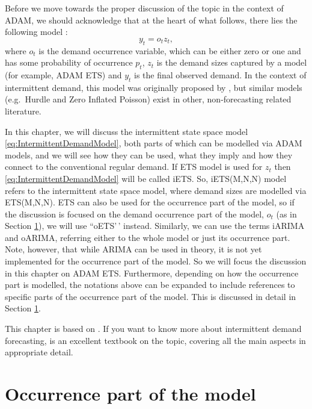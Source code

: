 \documentclass[
]{book}
\theoremstyle{definition}
\theoremstyle{definition}
\theoremstyle{definition}
\theoremstyle{definition}
\theoremstyle{remark}
\begin{document}
Before we move towards the proper discussion of the topic in the context of ADAM, we should acknowledge that at the heart of what follows, there lies the following model \citep{Croston1972}:
\begin{equation}
  y_t = o_t z_t ,
  \label{eq:IntermittentDemandModel}
\end{equation}
where \(o_t\) is the demand occurrence variable, which can be either zero or one and has some probability of occurrence \(p_t\), \(z_t\) is the demand sizes captured by a model (for example, ADAM ETS) and \(y_t\) is the final observed demand. In the context of intermittent demand, this model was originally proposed by \citet{Croston1972}, but similar models (e.g.~Hurdle and Zero Inflated Poisson) exist in other, non-forecasting related literature.

In this chapter, we will discuss the intermittent state space model \eqref{eq:IntermittentDemandModel}, both parts of which can be modelled via ADAM models, and we will see how they can be used, what they imply and how they connect to the conventional regular demand. If ETS model is used for \(z_t\) then \eqref{eq:IntermittentDemandModel} will be called iETS. So, iETS(M,N,N) model refers to the intermittent state space model, where demand sizes are modelled via ETS(M,N,N). ETS can also be used for the occurrence part of the model, so if the discussion is focused on the demand occurrence part of the model, \(o_t\) (as in Section \ref{ADAMOccurrence}), we will use ``oETS'\,' instead. Similarly, we can use the terms iARIMA and oARIMA, referring either to the whole model or just its occurrence part. Note, however, that while ARIMA can be used in theory, it is not yet implemented for the occurrence part of the model. So we will focus the discussion in this chapter on ADAM ETS. Furthermore, depending on how the occurrence part is modelled, the notations above can be expanded to include references to specific parts of the occurrence part of the model. This is discussed in detail in Section \ref{ADAMOccurrence}.

This chapter is based on \citet{Svetunkov2019a}. If you want to know more about intermittent demand forecasting, \citet{BoylanSyntetos2021} is an excellent textbook on the topic, covering all the main aspects in appropriate detail.

\hypertarget{ADAMOccurrence}{%
\section{Occurrence part of the model}\label{ADAMOccurrence}}
\end{document}
